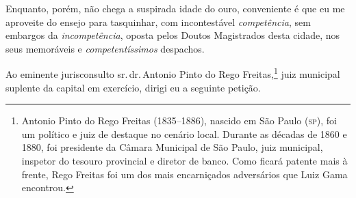 Enquanto, porém, não chega a suspirada idade do ouro, conveniente é que
eu me aproveite do ensejo para tasquinhar, com incontestável
\emph{competência}, sem embargos da \emph{incompetência}, oposta pelos
Doutos Magistrados desta cidade, nos seus memoráveis e
\emph{competentíssimos} despachos.

Ao eminente jurisconsulto sr.\,dr.\,Antonio Pinto do Rego
Freitas,\footnote{Antonio Pinto do Rego Freitas (1835--1886), nascido em
  São Paulo (\textsc{sp}), foi um político e juiz de destaque no cenário local.
  Durante as décadas de 1860 e 1880, foi presidente da Câmara Municipal
  de São Paulo, juiz municipal, inspetor do tesouro provincial e diretor
  de banco. Como ficará patente mais à frente, Rego Freitas foi um dos
  mais encarniçados adversários que Luiz Gama encontrou.} juiz
municipal suplente da capital em exercício, dirigi eu a seguinte
petição.

